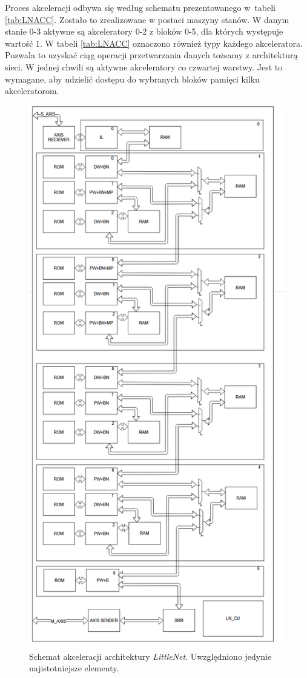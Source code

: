 Proces akceleracji odbywa się według schematu prezentowanego w~tabeli \ref{tab:LNACC}.
Zostało to zrealizowane w postaci maszyny stanów.
W danym stanie 0-3 aktywne są akceleratory 0-2 z bloków 0-5, dla których występuje wartość 1.
W tabeli \ref{tab:LNACC} oznaczono również typy każdego akceleratora.
Pozwala to uzyskać ciąg operacji przetwarzania danych tożsamy z architekturą sieci. 
W jednej chwili są aktywne akceleratory co czwartej warstwy.
Jest to wymagane, aby udzielić dostępu do wybranych bloków pamięci kilku akceleratorom.

\begin{figure}
    \centering
    \includegraphics[height=0.9\textheight]{images/LNACC.png}
    \caption{Schemat akceleracji architektury \emph{LittleNet}. Uwzględniono jedynie najistotniejsze elementy.}
    \label{fig:LNACC}
\end{figure}
